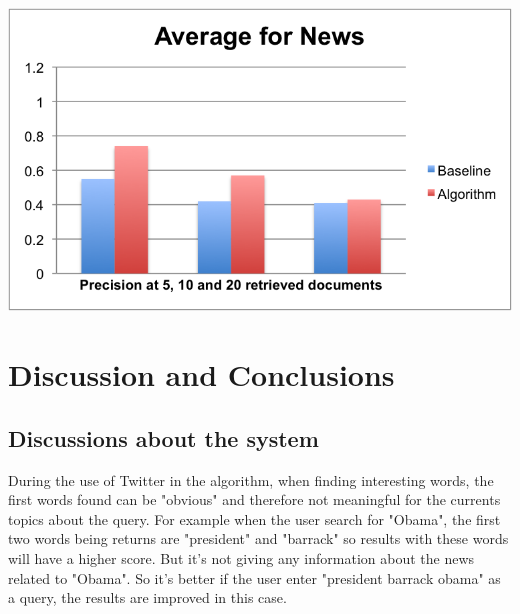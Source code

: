 \documentclass{acmsmall}
\begin{document}
\begin{center}
	\includegraphics[scale=1.00]{Average_News.png}
\end{center}




\section{Discussion and Conclusions}

\subsection{Discussions about the system}

During the use of Twitter in the algorithm, when finding interesting words, the first words found can be "obvious" and therefore not meaningful for the currents topics about the query. For example when the user search for "Obama", the first two words being returns are "president" and "barrack" so results with these words will have a higher score. But it's not giving any information about the news related to "Obama". So it's better if the user enter "president barrack obama" as a query, the results are improved in this case.
\end{document}
